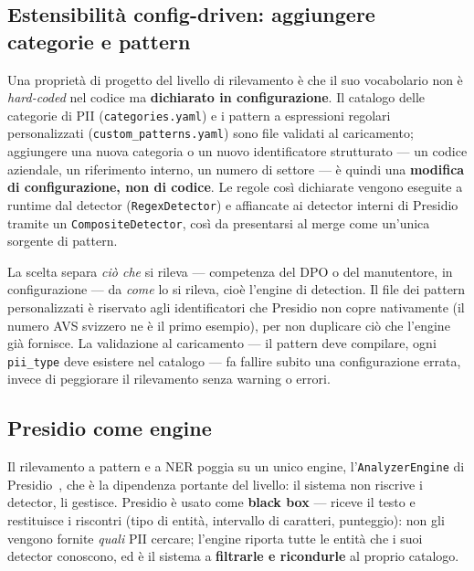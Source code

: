 \subsection{Estensibilità config-driven: aggiungere categorie e pattern}
\label{sub:estensibilita-detection}

Una proprietà di progetto del livello di rilevamento è che il suo vocabolario non è \emph{hard-coded} nel codice ma \textbf{dichiarato in configurazione}. Il catalogo delle categorie di PII (\texttt{categories.yaml}) e i pattern a espressioni regolari personalizzati (\texttt{custom\_patterns.yaml}) sono file validati al caricamento; aggiungere una nuova categoria o un nuovo identificatore strutturato --- un codice aziendale, un riferimento interno, un numero di settore --- è quindi una \textbf{modifica di configurazione, non di codice}. Le regole così dichiarate vengono eseguite a runtime dal detector (\texttt{RegexDetector}) e affiancate ai detector interni di Presidio tramite un \texttt{CompositeDetector}, così da presentarsi al merge come un'unica sorgente di pattern.

La scelta separa \emph{ciò che} si rileva --- competenza del DPO o del manutentore, in configurazione --- da \emph{come} lo si rileva, cioè l'engine di detection. Il file dei pattern personalizzati è riservato agli identificatori che Presidio non copre nativamente (il numero AVS svizzero ne è il primo esempio), per non duplicare ciò che l'engine già fornisce. La validazione al caricamento --- il pattern deve compilare, ogni \texttt{pii\_type} deve esistere nel catalogo --- fa fallire subito una configurazione errata, invece di peggiorare il rilevamento senza warning o errori.

\subsection{Presidio come engine}
\label{sub:impl-presidio}

Il rilevamento a pattern e a NER poggia su un unico engine, l'\texttt{AnalyzerEngine} di Presidio~\cite{HomeMicrosoftPresidio}, che è la dipendenza portante del livello: il sistema non riscrive i detector, li gestisce. Presidio è usato come \textbf{black box} --- riceve il testo e restituisce i riscontri (tipo di entità, intervallo di caratteri, punteggio): non gli vengono fornite \emph{quali} PII cercare; l'engine riporta tutte le entità che i suoi detector conoscono, ed è il sistema a \textbf{filtrarle e ricondurle} al proprio catalogo.


